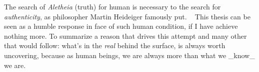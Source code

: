 The search of \textit{Aletheia} (truth) for human is necessary to the search for \textit{authenticity}, as philosopher Martin Heideiger famously put. ~\cite{} This thesis can be seen as a humble response in face of such human condition, if I have achieve nothing more. To summarize a reason that drives this attempt and many other that would follow: what's in the \textit{real} behind the surface, is always worth uncovering, because as human beings, we are always more than what we _know_ we are.













